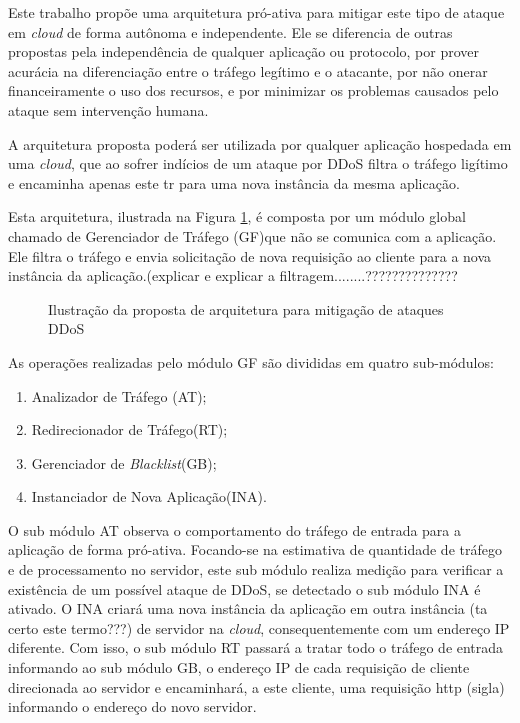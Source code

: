 \documentclass[a4paper, 12pt]{article}
\begin{document}
Este trabalho propõe uma arquitetura pró-ativa para mitigar este tipo de ataque em \emph{cloud} de forma autônoma e independente. Ele se diferencia de outras propostas pela independência de qualquer aplicação ou protocolo, por prover acurácia na diferenciação entre o tráfego legítimo e o atacante, por não onerar financeiramente o uso dos recursos, e por minimizar os problemas causados pelo ataque sem intervenção humana.

A arquitetura proposta poderá ser utilizada por qualquer aplicação hospedada em uma \emph{cloud}, que ao sofrer indícios de um ataque por DDoS filtra o tráfego ligítimo e encaminha apenas este tr para uma nova instância da mesma aplicação. 

Esta arquitetura, ilustrada na Figura \ref{fig:arq}, é composta por um módulo global chamado de Gerenciador de Tráfego (GF)que não se comunica com a aplicação. Ele filtra o tráfego e envia solicitação de  nova requisição ao cliente para a nova instância da aplicação.(explicar e explicar a filtragem........?????????????? 

\begin{figure}[h!]
\centering
\caption{Ilustração da proposta de arquitetura para mitigação de ataques DDoS}
\label{fig:arq}
\end{figure}

As operações realizadas pelo módulo GF são divididas em quatro sub-módulos:

\begin{enumerate}[i]
  \item Analizador de Tráfego (AT);
  \item Redirecionador de Tráfego(RT);
  \item Gerenciador de \emph{Blacklist}(GB);
  \item Instanciador de Nova Aplicação(INA).
\end{enumerate}

O sub módulo AT observa o comportamento do tráfego de entrada para a aplicação de forma pró-ativa. Focando-se na estimativa de quantidade de tráfego e de processamento no servidor, este sub módulo realiza medição para verificar a existência de um possível ataque de DDoS, se detectado o sub módulo INA é ativado. O INA criará uma nova instância da aplicação em outra instância (ta certo este termo???) de servidor na \emph{cloud}, consequentemente com um endereço IP diferente.
Com isso, o sub módulo RT passará a tratar todo o tráfego de entrada informando ao sub módulo GB, o endereço IP de cada requisição de cliente direcionada ao servidor e encaminhará, a este cliente, uma requisição http (sigla) informando o endereço do novo servidor. 
\end{document}
